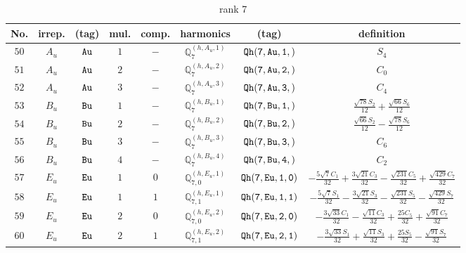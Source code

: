 \documentclass[fleqn,8pt]{jsarticle}
\begin{document}
\begin{table}[ht!]
\begin{center}
\caption{rank 7}
\renewcommand{\arraystretch}{1.3}
\begin{tabular}{cccccccc} \hline \hline
No. & irrep. & (tag) & mul. & comp. & harmonics & (tag) & definition \\ \hline
$ 50 $ & $ A_{u} $ & $ {\tt Au} $ & $ 1 $ & $ - $ & $ \mathbb{Q}_{7}^{(h,A_{u},1)} $ & $ {\tt Qh(7,Au,1,)} $ & $ S_{4} $ \\
$ 51 $ & $ A_{u} $ & $ {\tt Au} $ & $ 2 $ & $ - $ & $ \mathbb{Q}_{7}^{(h,A_{u},2)} $ & $ {\tt Qh(7,Au,2,)} $ & $ C_{0} $ \\
$ 52 $ & $ A_{u} $ & $ {\tt Au} $ & $ 3 $ & $ - $ & $ \mathbb{Q}_{7}^{(h,A_{u},3)} $ & $ {\tt Qh(7,Au,3,)} $ & $ C_{4} $ \\
$ 53 $ & $ B_{u} $ & $ {\tt Bu} $ & $ 1 $ & $ - $ & $ \mathbb{Q}_{7}^{(h,B_{u},1)} $ & $ {\tt Qh(7,Bu,1,)} $ & $ \frac{\sqrt{78} S_{2}}{12} + \frac{\sqrt{66} S_{6}}{12} $ \\
$ 54 $ & $ B_{u} $ & $ {\tt Bu} $ & $ 2 $ & $ - $ & $ \mathbb{Q}_{7}^{(h,B_{u},2)} $ & $ {\tt Qh(7,Bu,2,)} $ & $ \frac{\sqrt{66} S_{2}}{12} - \frac{\sqrt{78} S_{6}}{12} $ \\
$ 55 $ & $ B_{u} $ & $ {\tt Bu} $ & $ 3 $ & $ - $ & $ \mathbb{Q}_{7}^{(h,B_{u},3)} $ & $ {\tt Qh(7,Bu,3,)} $ & $ C_{6} $ \\
$ 56 $ & $ B_{u} $ & $ {\tt Bu} $ & $ 4 $ & $ - $ & $ \mathbb{Q}_{7}^{(h,B_{u},4)} $ & $ {\tt Qh(7,Bu,4,)} $ & $ C_{2} $ \\
$ 57 $ & $ E_{u} $ & $ {\tt Eu} $ & $ 1 $ & $ 0 $ & $ \mathbb{Q}_{7,0}^{(h,E_{u},1)} $ & $ {\tt Qh(7,Eu,1,0)} $ & $ - \frac{5 \sqrt{7} C_{1}}{32} + \frac{3 \sqrt{21} C_{3}}{32} - \frac{\sqrt{231} C_{5}}{32} + \frac{\sqrt{429} C_{7}}{32} $ \\
$ 58 $ & $ E_{u} $ & $ {\tt Eu} $ & $ 1 $ & $ 1 $ & $ \mathbb{Q}_{7,1}^{(h,E_{u},1)} $ & $ {\tt Qh(7,Eu,1,1)} $ & $ - \frac{5 \sqrt{7} S_{1}}{32} - \frac{3 \sqrt{21} S_{3}}{32} - \frac{\sqrt{231} S_{5}}{32} - \frac{\sqrt{429} S_{7}}{32} $ \\
$ 59 $ & $ E_{u} $ & $ {\tt Eu} $ & $ 2 $ & $ 0 $ & $ \mathbb{Q}_{7,0}^{(h,E_{u},2)} $ & $ {\tt Qh(7,Eu,2,0)} $ & $ - \frac{3 \sqrt{33} C_{1}}{32} - \frac{\sqrt{11} C_{3}}{32} + \frac{25 C_{5}}{32} + \frac{\sqrt{91} C_{7}}{32} $ \\
$ 60 $ & $ E_{u} $ & $ {\tt Eu} $ & $ 2 $ & $ 1 $ & $ \mathbb{Q}_{7,1}^{(h,E_{u},2)} $ & $ {\tt Qh(7,Eu,2,1)} $ & $ - \frac{3 \sqrt{33} S_{1}}{32} + \frac{\sqrt{11} S_{3}}{32} + \frac{25 S_{5}}{32} - \frac{\sqrt{91} S_{7}}{32} $ \\

\end{tabular}
\end{center}
\end{table}
\end{document}
